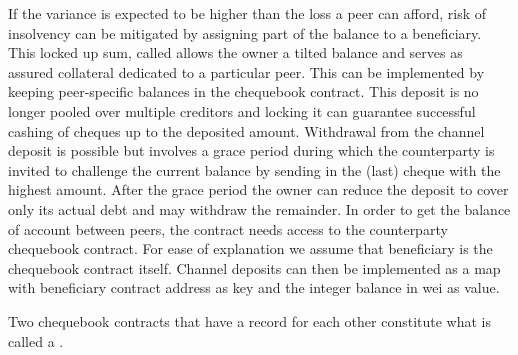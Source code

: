 If the variance is expected to be higher than the loss a peer can afford,
risk of insolvency can be mitigated by assigning part of the balance to a beneficiary.
This locked up sum, called  allows the owner a tilted balance and
serves as assured collateral dedicated to a particular peer.
This can be implemented by keeping peer-specific balances in the chequebook contract.
This deposit is no longer pooled over multiple creditors
and locking it can guarantee successful cashing of cheques up to the deposited amount.
Withdrawal from the channel deposit is possible but involves a grace period during which
the counterparty is invited to challenge the current balance by sending in the (last) cheque
with the highest amount. After the grace period the owner can reduce the deposit to cover only
its actual debt and may withdraw the remainder.
In order to get the balance of account between peers, the contract needs access to the counterparty
chequebook contract. For ease of explanation we assume that beneficiary is the
chequebook contract itself. Channel deposits can then be implemented as a map with beneficiary contract
address as key and the integer balance in wei as value.

Two chequebook contracts that have a record for each other constitute what is
called a .


